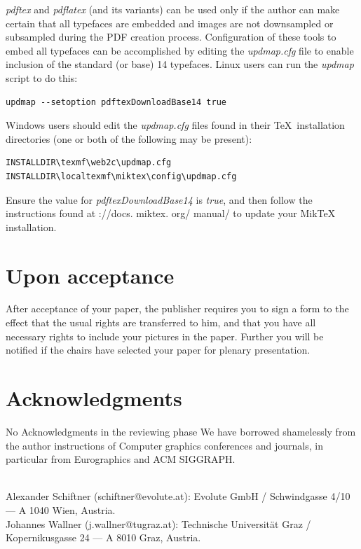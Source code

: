 \documentclass[twoside]{article}
\begin{document}
{\em pdftex} and {\em pdflatex} (and its variants) can be used only if the 
author can make certain that all typefaces are embedded and images are not 
downsampled or subsampled during the PDF creation process. Configuration 
of these tools to embed all typefaces can be accomplished by editing the 
{\em updmap.cfg} file to enable inclusion of the standard (or base) 14 
typefaces. Linux users can run the {\em updmap} script to do this:

{\footnotesize\begin{verbatim} 
updmap --setoption pdftexDownloadBase14 true 
\end{verbatim}}

Windows users should edit the {\em updmap.cfg} files found in their \TeX\ 
installation directories (one or both of the following may be present):

{\footnotesize\begin{verbatim}
INSTALLDIR\texmf\web2c\updmap.cfg
INSTALLDIR\localtexmf\miktex\config\updmap.cfg
\end{verbatim}}

Ensure the value for {\em pdftexDownloadBase14} is {\em true}, and then 
follow the instructions found at {\http://docs. miktex. org/ manual/} to 
update your MikTeX installation.


\section{Upon acceptance}

After acceptance of your paper, the publisher requires you to sign a form 
to the effect that the usual rights are transferred to him, and that you 
have all necessary rights to include your pictures in the paper. Further 
you will be notified if the chairs have selected your paper for plenary 
presentation.

\section*{Acknowledgments}

\ifreviewing
No Acknowledgments in the reviewing phase
\else
We have borrowed shamelessly from the author instructions of Computer 
graphics conferences and journals, in particular from Eurographics and ACM 
SIGGRAPH.
\fi

\nocite{*} %


\ifreviewing\else\vfill

 \\[1ex]
Alexander Schiftner (schiftner@evolute.at):
Evolute GmbH / 
Schwindgasse 4/10 --- A 1040 Wien, Austria. \\
Johannes Wallner (j.wallner@tugraz.at):
Technische Universit\"at Graz / 
Kopernikusgasse 24 --- A 8010 Graz, Austria.\fi
\end{document}
